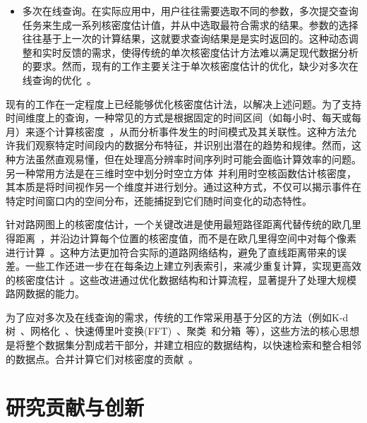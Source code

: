 \begin{itemize}[leftmargin=*]
	\item 多次在线查询。在实际应用中，用户往往需要选取不同的参数，多次提交查询任务来生成一系列核密度估计值，并从中选取最符合需求的结果。参数的选择往往基于上一次的计算结果，这就要求查询结果是是实时返回的。这种动态调整和实时反馈的需求，使得传统的单次核密度估计方法难以满足现代数据分析的要求。然而，现有的工作主要关注于单次核密度估计的优化，缺少对多次在线查询的优化~\cite{gong_estimating_2014, gan_scalable_2017, plug_spatial_2011, brunsdon_visualising_2007, chan_safe_2021, cristianini_dynamically_1998, gramacki_nonparametric_2018}。
\end{itemize}

现有的工作在一定程度上已经能够优化核密度估计法，以解决上述问题。为了支持时间维度上的查询，一种常见的方式是根据固定的时间区间（如每小时、每天或每月）来逐个计算核密度~\cite{plug_spatial_2011}，从而分析事件发生的时间模式及其关联性。这种方法允许我们观察特定时间段内的数据分布特征，并识别出潜在的趋势和规律。然而，这种方法虽然直观易懂，但在处理高分辨率时间序列时可能会面临计算效率的问题。
另一种常用方法是在三维时空中划分时空立方体~\cite{nakaya_visualising_2010, black_highway_1991}并利用时空核函数估计核密度\cite{brunsdon_visualising_2007, romano_visualizing_2017, chan_sws_2021}，其本质是将时间视作另一个维度并进行划分。通过这种方式，不仅可以揭示事件在特定时间窗口内的空间分布，还能捕捉到它们随时间变化的动态特性。

针对路网图上的核密度估计，一个关键改进是使用最短路径距离代替传统的欧几里得距离~\cite{borruso_network_2005}，并沿边计算每个位置的核密度值，而不是在欧几里得空间中对每个像素进行计算~\cite{xie_kernel_2008}。这种方法更加符合实际的道路网络结构，避免了直线距离带来的误差。一些工作还进一步在在每条边上建立列表索引，来减少重复计算，实现更高效的核密度估计~\cite{chan_fast_2021}。这些改进通过优化数据结构和计算流程，显著提升了处理大规模路网数据的能力。

为了应对多次及在线查询的需求，传统的工作常采用基于分区的方法（例如K-d树~\cite{chan_efficient_2020, chan_quad_2020, chan_karl_2019}、网格化~\cite{hart_kernel_2014, black_highway_1991}、快速傅里叶变换(FFT)~\cite{silverman_algorithm_1982, gramacki_nonparametric_2018}、聚类~\cite{auber_interactive_2005, abello_ask-graphview_2006, hinneburg_denclue_2007}和分箱~\cite{liu_immens_2013, gramacki_nonparametric_2018, li_interactive_2014}等），这些方法的核心思想是将整个数据集分割成若干部分，并建立相应的数据结构，以快速检索和整合相邻的数据点。合并计算它们对核密度的贡献~\cite{liu_immens_2013}。

\section{研究贡献与创新}

